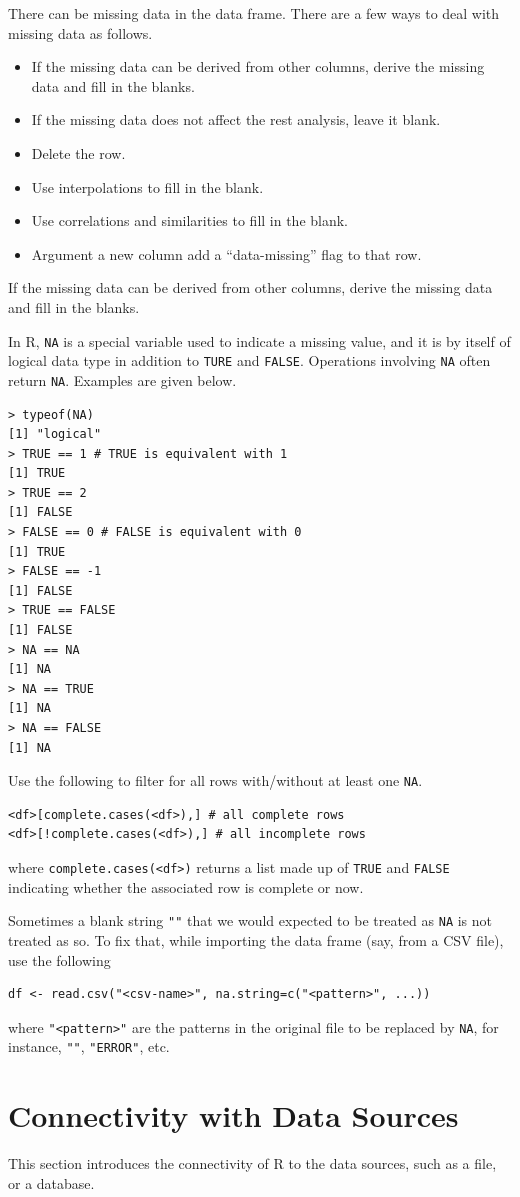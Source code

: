 There can be missing data in the data frame. There are a few ways to deal with missing data as follows.
\begin{itemize}
	\item If the missing data can be derived from other columns, derive the missing data and fill in the blanks.
	\item If the missing data does not affect the rest analysis, leave it blank.
	\item Delete the row.
	\item Use interpolations to fill in the blank.
	\item Use correlations and similarities to fill in the blank.
	\item Argument a new column add a ``data-missing'' flag to that row.
\end{itemize}

If the missing data can be derived from other columns, derive the missing data and fill in the blanks.

In R, \verb|NA| is a special variable used to indicate a missing value, and it is by itself of logical data type in addition to \verb|TURE| and \verb|FALSE|. Operations involving \verb|NA| often return \verb|NA|. Examples are given below.
\begin{lstlisting}
> typeof(NA)
[1] "logical"
> TRUE == 1 # TRUE is equivalent with 1
[1] TRUE
> TRUE == 2
[1] FALSE
> FALSE == 0 # FALSE is equivalent with 0
[1] TRUE
> FALSE == -1
[1] FALSE
> TRUE == FALSE
[1] FALSE
> NA == NA
[1] NA
> NA == TRUE
[1] NA
> NA == FALSE
[1] NA
\end{lstlisting}

Use the following to filter for all rows with/without at least one \verb|NA|.
\begin{lstlisting}
<df>[complete.cases(<df>),] # all complete rows
<df>[!complete.cases(<df>),] # all incomplete rows
\end{lstlisting}
where \verb|complete.cases(<df>)| returns a list made up of \verb|TRUE| and \verb|FALSE| indicating whether the associated row is complete or now.

Sometimes a blank string \verb|""| that we would expected to be treated as \verb|NA| is not treated as so. To fix that, while importing the data frame (say, from a CSV file), use the following
\begin{lstlisting}
df <- read.csv("<csv-name>", na.string=c("<pattern>", ...))
\end{lstlisting}
where \verb|"<pattern>"| are the patterns in the original file to be replaced by \verb|NA|, for instance, \verb|""|, \verb|"ERROR"|, etc.

\section{Connectivity with Data Sources} \label{ch:r1:sec:datasource}

This section introduces the connectivity of R to the data sources, such as a file, or a database.







